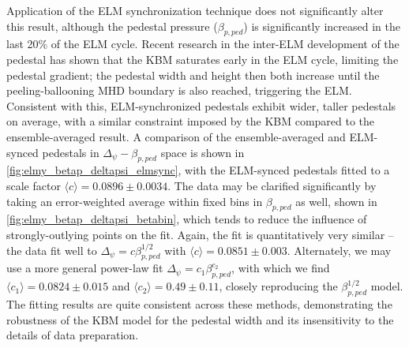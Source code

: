 Application of the ELM synchronization technique does not significantly alter this result, although the pedestal pressure (\ie $\beta_{p,ped}$) is significantly increased in the last 20\% of the ELM cycle.  Recent research in the inter-ELM development of the pedestal \cite{Diallo2014} has shown that the KBM saturates early in the ELM cycle, limiting the pedestal gradient; the pedestal width and height then both increase until the peeling-ballooning MHD boundary is also reached, triggering the ELM.  Consistent with this, ELM-synchronized pedestals exhibit wider, taller pedestals on average, with a similar constraint imposed by the KBM compared to the ensemble-averaged result.  A comparison of the ensemble-averaged and ELM-synced pedestals in $\Delta_\psi - \beta_{p,ped}$ space is shown in \cref{fig:elmy_betap_deltapsi_elmsync}, with the ELM-synced pedestals fitted to a scale factor $\langle c \rangle = 0.0896 \pm 0.0034$.  The data may be clarified significantly by taking an error-weighted average within fixed bins in $\beta_{p,ped}$ as well, shown in \cref{fig:elmy_betap_deltapsi_betabin}, which tends to reduce the influence of strongly-outlying points on the fit.  Again, the fit is quantitatively very similar -- the data fit well to $\Delta_\psi = c \beta_{p,ped}^{1/2}$ with $\langle c \rangle = 0.0851 \pm 0.003$.  Alternately, we may use a more general power-law fit $\Delta_\psi = c_1 \beta_{p,ped}^{c_2}$, with which we find $\langle c_1 \rangle = 0.0824 \pm 0.015$ and $\langle c_2 \rangle = 0.49 \pm 0.11$, closely reproducing the $\beta_{p,ped}^{1/2}$ model.  The fitting results are quite consistent across these methods, demonstrating the robustness of the KBM model for the pedestal width and its insensitivity to the details of data preparation.

\begin{figure}[t]
 \pushtooutside
\end{figure}

